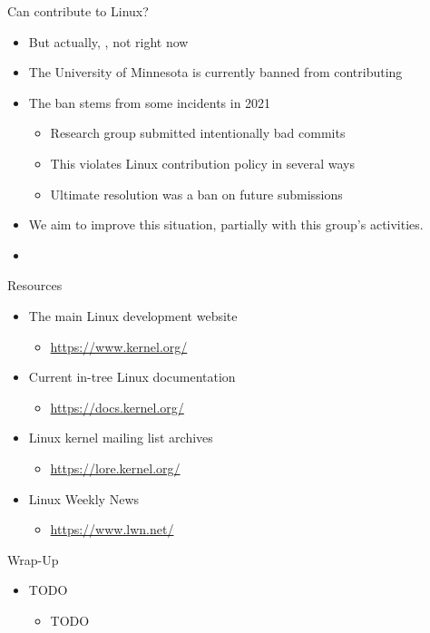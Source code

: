 \documentclass[aspectratio=169, notes]{beamer}
\newcommand{\todo}[1]{\note[item]{\textcolor{red}{\textbf{TODO:}} #1}}
\begin{document}
\begin{frame}{Can  contribute to Linux?}
	\begin{itemize}
	\item {}  But actually, , not right now
	\item The University of Minnesota is currently banned from contributing
	\item The ban stems from some incidents in 2021
		\begin{itemize}
		\item Research group submitted intentionally bad commits
		\item This violates Linux contribution policy in several ways
		\item Ultimate resolution was a ban on future submissions
		\end{itemize}
	\item We aim to improve this situation, partially with this group’s activities.
	\item {}
	\end{itemize}
\end{frame}

\begin{frame}{Resources}
	\begin{itemize}
	\item The main Linux development website
		\begin{itemize}
		\item \url{https://www.kernel.org/}
		\end{itemize}
	\item Current in-tree Linux documentation
		\begin{itemize}
		\item \url{https://docs.kernel.org/}
		\end{itemize}
	\item Linux kernel mailing list archives
		\begin{itemize}
		\item \url{https://lore.kernel.org/}
		\end{itemize}
	\item Linux Weekly News
		\begin{itemize}
		\item \url{https://www.lwn.net/}
		\end{itemize}
	\end{itemize}
\end{frame}

\begin{frame}{Wrap-Up}
	\begin{itemize}
	\item TODO
		\begin{itemize}
		\item TODO
		\end{itemize}
	\end{itemize}
	\todo{write me}
\end{frame}
\end{document}
